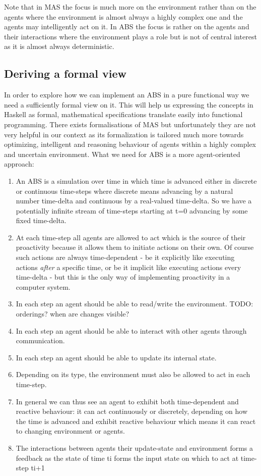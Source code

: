 Note that in MAS the focus is much more on the environment rather than on the agents where the environment is almost always a highly complex one and the agents may intelligently act on it. In ABS the focus is rather on the agents and their interactions where the environment plays a role but is not of central interest as it is almost always deterministic.

\subsection{Deriving a formal view}
In order to explore how we can implement an ABS in a pure functional way we need a sufficiently formal view on it. This will help us expressing the concepts in Haskell as formal, mathematical specifications translate easily into functional programming. There exists formalisations of MAS \cite{wooldridge_introduction_2009} but unfortunately they are not very helpful in our context as its formalization is tailored much more towards optimizing, intelligent and reasoning behaviour of agents within a highly complex and uncertain environment. What we need for ABS is a more agent-oriented approach: 

\begin{enumerate}
	\item An ABS is a simulation over time in which time is advanced either in discrete or continuous time-steps where discrete means advancing by a natural number time-delta and continuous by a real-valued time-delta. So we have a potentially infinite stream of time-steps starting at t=0 advancing by some fixed time-delta.
	\item At each time-step all agents are allowed to act which is the source of their proactivity because it allows them to initiate actions on their own. Of course such actions are always time-dependent - be it explicitly like executing actions \textit{after} a specific time, or be it implicit like executing actions every time-delta - but this is the only way of implementing proactivity in a computer system.
	\item In each step an agent should be able to read/write the environment. TODO: orderings? when are changes visible?
	\item In each step an agent should be able to interact with other agents through communication. 
	\item In each step an agent should be able to update its internal state.
	\item Depending on its type, the environment must also be allowed to act in each time-step.
	\item In general we can thus see an agent to exhibit both time-dependent and reactive behaviour: it can act continuously or discretely, depending on how the time is advanced and exhibit reactive behaviour which means it can react to changing environment or agents.
	\item The interactions between agents their update-state and environment forms a feedback as the state of time ti forms the input state on which to act at time-step ti+1
\end{enumerate}
